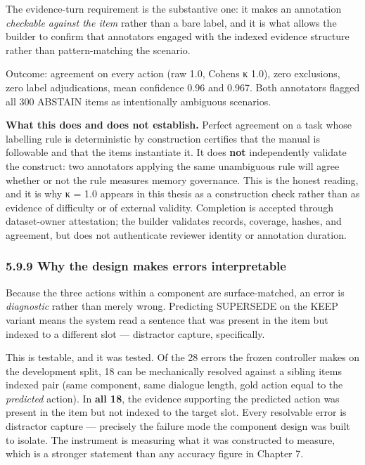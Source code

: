 The evidence-turn requirement is the substantive one: it makes an
annotation \emph{checkable against the item} rather than a bare label,
and it is what allows the builder to confirm that annotators engaged
with the indexed evidence structure rather than pattern-matching the
scenario.

Outcome: agreement on every action (raw 1.0, Cohen\textquotesingle s κ
1.0), zero exclusions, zero label adjudications, mean confidence 0.96
and 0.967. Both annotators flagged all 300 ABSTAIN items as
intentionally ambiguous scenarios.

\textbf{What this does and does not establish.} Perfect agreement on a
task whose labelling rule is deterministic by construction certifies
that the manual is followable and that the items instantiate it. It does
\textbf{not} independently validate the construct: two annotators
applying the same unambiguous rule will agree whether or not the rule
measures memory governance. This is the honest reading, and it is why κ
= 1.0 appears in this thesis as a construction check rather than as
evidence of difficulty or of external validity. Completion is accepted
through dataset-owner attestation; the builder validates records,
coverage, hashes, and agreement, but does not authenticate reviewer
identity or annotation duration.

\subsubsection{5.9.9 Why the design makes errors
interpretable}\label{why-the-design-makes-errors-interpretable}

Because the three actions within a component are surface-matched, an
error is \emph{diagnostic} rather than merely wrong. Predicting
SUPERSEDE on the KEEP variant means the system read a sentence that was
present in the item but indexed to a different slot --- distractor
capture, specifically.

This is testable, and it was tested. Of the 28 errors the frozen
controller makes on the development split, 18 can be mechanically
resolved against a sibling item\textquotesingle s indexed pair (same
component, same dialogue length, gold action equal to the
\emph{predicted} action). In \textbf{all 18}, the evidence supporting
the predicted action was present in the item but not indexed to the
target slot. Every resolvable error is distractor capture --- precisely
the failure mode the component design was built to isolate. The
instrument is measuring what it was constructed to measure, which is a
stronger statement than any accuracy figure in Chapter 7.

